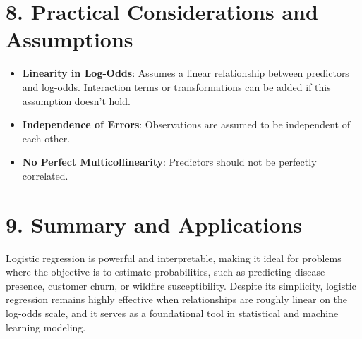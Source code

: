 \documentclass{article}
\begin{document}
\section*{8. Practical Considerations and Assumptions}

\begin{itemize}
    \item \textbf{Linearity in Log-Odds}: Assumes a linear relationship between predictors and log-odds. Interaction terms or transformations can be added if this assumption doesn’t hold.
    \item \textbf{Independence of Errors}: Observations are assumed to be independent of each other.
    \item \textbf{No Perfect Multicollinearity}: Predictors should not be perfectly correlated.
\end{itemize}

\section*{9. Summary and Applications}

Logistic regression is powerful and interpretable, making it ideal for problems where the objective is to estimate probabilities, such as predicting disease presence, customer churn, or wildfire susceptibility. Despite its simplicity, logistic regression remains highly effective when relationships are roughly linear on the log-odds scale, and it serves as a foundational tool in statistical and machine learning modeling.
\end{document}
